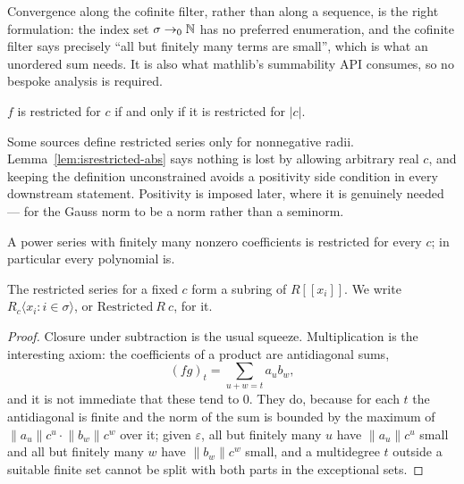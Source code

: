Convergence along the cofinite filter, rather than along a sequence, is the right formulation:
the index set $\sigma \to_0 \mathbb{N}$ has no preferred enumeration, and the cofinite filter says
precisely ``all but finitely many terms are small'', which is what an unordered sum needs.  It
is also what mathlib's summability API consumes, so no bespoke analysis is required.

\begin{lemma}
  \label{lem:isrestricted-abs}
  \leanok
  $f$ is restricted for $c$ if and only if it is restricted for $\lvert c \rvert$.
\end{lemma}

Some sources define restricted series only for nonnegative radii.  Lemma~\ref{lem:isrestricted-abs}
says nothing is lost by allowing arbitrary real $c$, and keeping the definition unconstrained
avoids a positivity side condition in every downstream statement.  Positivity is imposed later,
where it is genuinely needed --- for the Gauss norm to be a norm rather than a seminorm.

\begin{lemma}
  \label{lem:isrestricted-finite-support}
  \leanok
  A power series with finitely many nonzero coefficients is restricted for every $c$; in
  particular every polynomial is.
\end{lemma}

\begin{proposition}
  \label{prop:restricted-ring}
  \leanok
  The restricted series for a fixed $c$ form a subring of $R[[x_i]]$.  We write $R_c\langle x_i :
  i \in \sigma\rangle$, or $\mathrm{Restricted}\ R\ c$, for it.
\end{proposition}

\begin{proof}
  \leanok
  Closure under subtraction is the usual squeeze.  Multiplication is the interesting axiom: the
  coefficients of a product are antidiagonal sums,
  \[
    (fg)_t = \sum_{u + w = t} a_u b_w ,
  \]
  and it is not immediate that these tend to $0$.  They do, because for each $t$ the
  antidiagonal is finite and the norm of the sum is bounded by the maximum of $\lVert a_u
  \rVert c^u \cdot \lVert b_w \rVert c^w$ over it; given $\varepsilon$, all but finitely many
  $u$ have $\lVert a_u\rVert c^u$ small and all but finitely many $w$ have $\lVert b_w \rVert
  c^w$ small, and a multidegree $t$ outside a suitable finite set cannot be split with both
  parts in the exceptional sets.
\end{proof}

